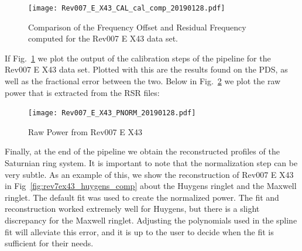 \documentclass[titlepage, 12pt]{article}
\begin{document}
            \clearpage
            \begin{figure}[H]
                \centering
                \texttt{[image: Rev007\_E\_X43\_CAL\_cal\_comp\_20190128.pdf]}
                \caption[Comparison of Frequency Offset with PDS]
                    {Comparison of the Frequency Offset and Residual Frequency
                     computed for the Rev007 E X43 data set.}
                \label{fig:rev7ex43_cal_comp_1}
            \end{figure}
            If Fig.~\ref{fig:rev7ex43_cal_comp_1} we plot the output of the
            calibration steps of the pipeline for the Rev007 E X43 data set.
            Plotted with this are the results found on the PDS, as well as the
            fractional error between the two. Below in
            Fig.~\ref{fig:rev7ex43_pnorm} we plot the raw power that is
            extracted from the RSR files:
            \clearpage
            \begin{figure}[H]
                \texttt{[image: Rev007\_E\_X43\_PNORM\_20190128.pdf]}
                \caption{Raw Power from Rev007 E X43}
                \label{fig:rev7ex43_pnorm}
            \end{figure}
            Finally, at the end of the pipeline we obtain the reconstructed
            profiles of the Saturnian ring system. It is important to note that
            the normalization step can be very subtle. As an example of this,
            we show the reconstruction of Rev007 E X43 in
            Fig~\ref{fig:rev7ex43_huygens_comp} about the Huygens ringlet and
            the Maxwell ringlet. The default fit was used to create the
            normalized power. The fit and reconstruction worked extremely well
            for Huygens, but there is a slight discrepancy for the Maxwell
            ringlet. Adjusting the polynomials used in the spline fit will
            alleviate this error, and it is up to the user to decide when the
            fit is sufficient for their needs.
\end{document}
